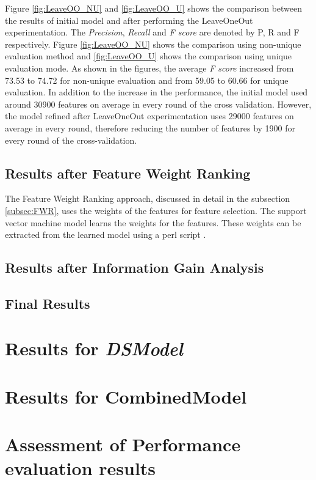 Figure \ref{fig:LeaveOO_NU} and \ref{fig:LeaveOO_U} shows the comparison between the results of initial model and after performing the LeaveOneOut experimentation.  The \textit{Precision}, \textit{Recall} and \textit{F score} are denoted by P, R and F respectively. Figure \ref{fig:LeaveOO_NU} shows the comparison using non-unique evaluation method and \ref{fig:LeaveOO_U} shows the comparison using unique evaluation mode. As shown in the figures, the average \textit{F score} increased from 73.53 to 74.72 for non-unique evaluation and from 59.05 to 60.66 for unique evaluation. In addition to the increase in the performance, the initial model used around 30900 features on average in every round of the cross validation. However, the model refined after LeaveOneOut experimentation uses 29000 features on average in every round, therefore reducing the number of features by 1900 for every round of the cross-validation.

\subsection{Results after Feature Weight Ranking}

The Feature Weight Ranking approach, discussed in detail in the subsection \ref{subsec:FWR}, uses the weights of the features for feature selection. The support vector machine model learns the weights for the features. These weights can be extracted from the learned model using a perl script \cite{svmlightonline}. 
 

\subsection{Results after Information Gain Analysis}

\subsection{Final Results}\label{subsec:SSFinalRes}

\section{Results for \textit{DSModel}}

\section{Results for CombinedModel}

\section{Assessment of Performance evaluation results}

